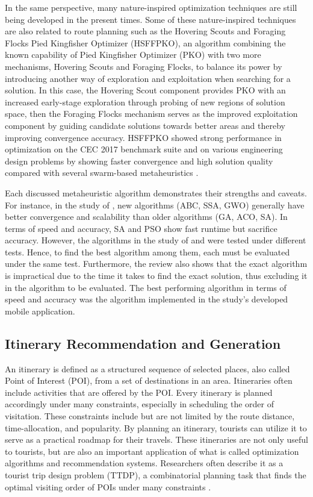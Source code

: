 In the same perspective, many nature-inspired optimization techniques are still being developed in the present times. Some of these nature-inspired techniques are also related to route planning such as the Hovering Scouts and Foraging Flocks Pied Kingfisher Optimizer (HSFFPKO), an algorithm combining the known capability of Pied Kingfisher Optimizer (PKO) with two more mechanisms, Hovering Scouts and Foraging Flocks, to balance its power by introducing another way of exploration and exploitation when searching for a solution. In this case, the Hovering Scout component provides PKO with an increased early-stage exploration through probing of new regions of solution space, then the Foraging Flocks mechanism serves as the improved exploitation component by guiding candidate solutions towards better areas and thereby improving convergence accuracy. HSFFPKO showed strong performance in optimization on the CEC 2017 benchmark suite and on various engineering design problems by showing faster convergence and high solution quality compared with several swarm-based metaheuristics \parencite{DelaCruz2025HSFFPKO}.

Each discussed metaheuristic algorithm demonstrates their strengths and caveats. For instance, in the study of \textcite{Hossain2024}, new algorithms (ABC, SSA, GWO) generally have better convergence and scalability than older algorithms (GA, ACO, SA). In terms of speed and accuracy, SA and PSO show fast runtime but sacrifice accuracy. However, the algorithms in the study of \textcite{Hossain2024} and \textcite{Wadi2025} were tested under different tests. Hence, to find the best algorithm among them, each must be evaluated under the same test. Furthermore, the review also shows that the exact algorithm is impractical due to the time it takes to find the exact solution, thus excluding it in the algorithm to be evaluated. The best performing algorithm in terms of speed and accuracy was the algorithm implemented in the study’s developed mobile application.


\subsection{Itinerary Recommendation and Generation}

An itinerary is defined as a structured sequence of selected places, also called Point of Interest (POI), from a set of destinations in an area. Itineraries often include activities that are offered by the POI. Every itinerary is planned accordingly under many constraints, especially in scheduling the order of visitation. These constraints include but are not limited by the route distance, time-allocation, and popularity. By planning an itinerary, tourists can utilize it to serve as a practical roadmap for their travels. These itineraries are not only useful to tourists, but are also an important application of what is called optimization algorithms and recommendation systems. Researchers often describe it as a tourist trip design problem (TTDP), a combinatorial planning task that finds the optimal visiting order of POIs under many constraints \parencite{Ruiz-Meza2022systematic}.

